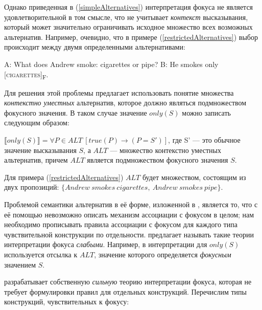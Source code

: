 \documentclass[a4paper, titlepage, 12pt]{article}
\begin{document}
Однако приведенная в (\ref{simpleAlternatives}) интерпретация фокуса не является удовлетворительной в том смысле, что не учитывает \textit{контекст} высказывания, который может значительно ограничивать исходное множество всех возможных альтернатив. Например, очевидно, что в примере (\ref{restrictedAlternatives}) выбор происходит между двумя определенными альтернативами:

\begin{exe}
    \ex \begin{xlist} \label{restrictedAlternatives}
        \ex A: What does Andrew smoke: cigarettes or pipe?
        \ex B: He smokes only [\textsc{cigarettes}]\textsubscript{F}.
    \end{xlist}
\end{exe}

Для решения этой проблемы \citep{rooth1992theory} предлагает использовать понятие множества \textit{контекстно уместных} альтернатив, которое должно являться подмножеством фокусного значения. В таком случае значение $ only(S) $ можно записать следующим образом:

\begin{exe}
    \ex \label{salientAlternatives}
        $ \llbracket only(S) \rrbracket = \forall P \in ALT\ [true(P) \rightarrow (P = S')] $, где S' --- это обычное значение высказывания $ S $, а $ ALT $ --- множество контекстно уместных альтернатив, причем $ ALT $ является подмножеством фокусного значения $ S $.
\end{exe}

Для примера (\ref{restrictedAlternatives}) $ ALT $ будет множеством, состоящим из двух пропозиций: $ \{ Andrew\ smokes\ cigarettes,\ Andrew\ smokes\ pipe \} $.

\medskip

Проблемой семантики альтернатив в её форме, изложенной в \citep{rooth1985association}, является то, что с её помощью невозможно описать механизм ассоциации с фокусом в целом; нам необходимо прописывать правила ассоциации с фокусом для каждого типа чувствительной конструкции по отдельности. \citep{rooth1992theory} предлагает называть такие теории интерпретации фокуса \textit{слабыми}. Например, в интерпретации для $ only(S) $ используется отсылка к $ ALT $, значение которого определяется \textit{фокусным} значением $ S $.

\medskip

\citep{rooth1992theory} разрабатывает собственную \textit{сильную} теорию интерпретации фокуса, которая не требует формулировки правил для отдельных конструкций. Перечислим типы конструкций, чувствительных к фокусу:
\end{document}
